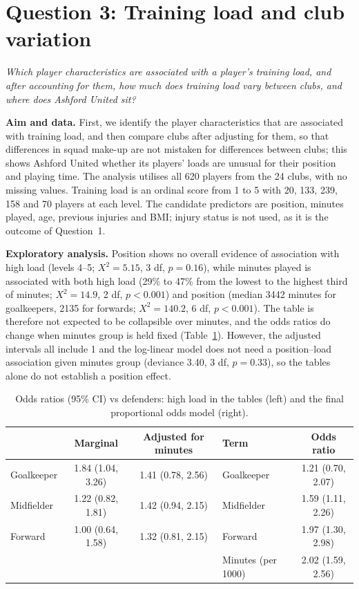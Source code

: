 \documentclass[11pt,a4paper]{article}
\begin{document}
\section*{Question 3: Training load and club variation}

\emph{Which player characteristics are associated with a player's training load, and after accounting for them, how much does training load vary between clubs, and where does Ashford United sit?}

\textbf{Aim and data.} First, we identify the player characteristics that are associated with training load, and then compare clubs after adjusting for them, so that differences in squad make-up are not mistaken for differences between clubs; this shows Ashford United whether its players' loads are unusual for their position and playing time. The analysis utilises all 620 players from the 24 clubs, with no missing values. Training load is an ordinal score from 1 to 5 with 20, 133, 239, 158 and 70 players at each level. The candidate predictors are position, minutes played, age, previous injuries and BMI; injury status is not used, as it is the outcome of Question~1.

\textbf{Exploratory analysis.} Position shows no overall evidence of association with high load (levels 4--5; $X^2=5.15$, 3 df, $p=0.16$), while minutes played is associated with both high load (29\% to 47\% from the lowest to the highest third of minutes; $X^2=14.9$, 2 df, $p<0.001$) and position (median 3442 minutes for goalkeepers, 2135 for forwards; $X^2=140.2$, 6 df, $p<0.001$). The table is therefore not expected to be collapsible over minutes, and the odds ratios do change when minutes group is held fixed (Table~\ref{tab:q3}). However, the adjusted intervals all include 1 and the log-linear model does not need a position--load association given minutes group (deviance 3.40, 3 df, $p=0.33$), so the tables alone do not establish a position effect.

\begin{table}[h]
\centering\small
\caption{Odds ratios (95\% CI) vs defenders: high load in the tables (left) and the final proportional odds model (right).}
\label{tab:q3}
\begin{tabular}{lcc@{\hspace{1.5em}}lc}
\toprule
 & Marginal & Adjusted for minutes & Term & Odds ratio \\
\midrule
Goalkeeper & 1.84 (1.04, 3.26) & 1.41 (0.78, 2.56) & Goalkeeper & 1.21 (0.70, 2.07) \\
Midfielder & 1.22 (0.82, 1.81) & 1.42 (0.94, 2.15) & Midfielder & 1.59 (1.11, 2.26) \\
Forward    & 1.00 (0.64, 1.58) & 1.32 (0.81, 2.15) & Forward & 1.97 (1.30, 2.98) \\
 & & & Minutes (per 1000) & 2.02 (1.59, 2.56) \\
\bottomrule
\end{tabular}
\end{table}
\end{document}
